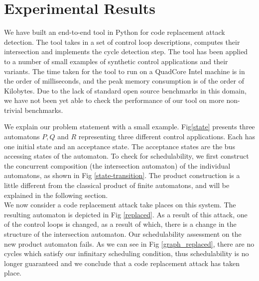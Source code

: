 \section{Experimental Results} \label{sec5}
\noindent
We have built an end-to-end tool in Python for code replacement attack detection.
The tool takes in a set of control loop descriptions, computes their intersection and 
implements the cycle detection step. The tool has been applied to a number of small 
examples of synthetic control applications and their variants. The time taken for
the tool to run on a QuadCore Intel machine is in the order of milliseconds, and the
peak memory consumption is of the order of Kilobytes. Due to the lack of standard open
source benchmarks in this domain, we have not been yet able to check the performance of
our tool on more non-trivial benchmarks. 

\noindent
We explain our problem statement with a small example. Fig\ref{state} presents three automatons $P,Q$ and $R$ representing three different control applications.
Each has one initial state and an acceptance state. The acceptance states are the bus accessing states
of the automaton. To check for schedulability, we first construct the concurrent composition (the intersection automaton) of the individual automatons, as shown in Fig \ref{state-transition}. The product construction is a little different from the classical product of finite automatons, and will be explained in the following section. \\ 

\noindent
We now consider a code replacement attack take places on this system. The resulting automaton is depicted in Fig \ref{replaced}.
As a result of this attack, one of the control loops is changed, as a result of which, there is a change in the structure of the intersection automaton. Our schedulability assessment on the new product automaton fails. As we can see in Fig \ref{graph_replaced}, there are no cycles which satisfy our infinitary scheduling condition, thus schedulability is no longer guaranteed and we conclude that a code replacement attack has taken place.


